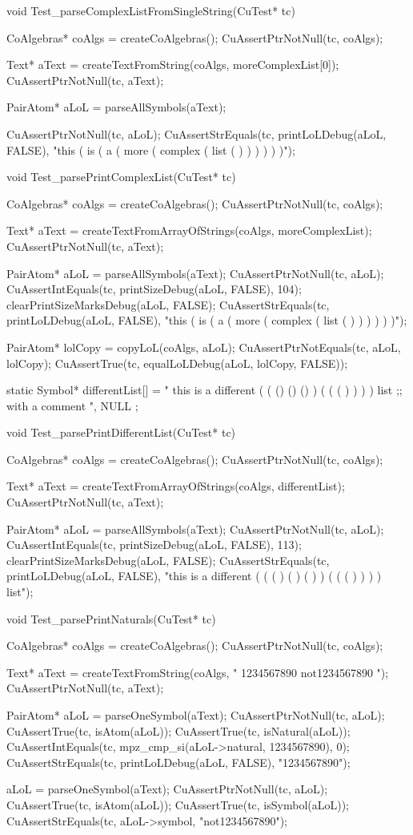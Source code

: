 void Test_parseComplexListFromSingleString(CuTest* tc) {
  CoAlgebras* coAlgs = createCoAlgebras();
  CuAssertPtrNotNull(tc, coAlgs);

  Text* aText = createTextFromString(coAlgs, moreComplexList[0]);
  CuAssertPtrNotNull(tc, aText);

  PairAtom* aLoL = parseAllSymbols(aText);

  CuAssertPtrNotNull(tc, aLoL);
  CuAssertStrEquals(tc, printLoLDebug(aLoL, FALSE),
    "this ( is ( a ( more ( complex ( list ( ) ) ) ) ) )");
}

void Test_parsePrintComplexList(CuTest* tc) {
  CoAlgebras* coAlgs = createCoAlgebras();
  CuAssertPtrNotNull(tc, coAlgs);

  Text* aText = createTextFromArrayOfStrings(coAlgs, moreComplexList);
  CuAssertPtrNotNull(tc, aText);

  PairAtom* aLoL = parseAllSymbols(aText);
  CuAssertPtrNotNull(tc, aLoL);
  CuAssertIntEquals(tc, printSizeDebug(aLoL, FALSE), 104);
  clearPrintSizeMarksDebug(aLoL, FALSE);
  CuAssertStrEquals(tc, printLoLDebug(aLoL, FALSE),
    "this ( is ( a ( more ( complex ( list ( ) ) ) ) ) )");

  PairAtom* lolCopy = copyLoL(coAlgs, aLoL);
  CuAssertPtrNotEquals(tc, aLoL, lolCopy);
  CuAssertTrue(tc, equalLoLDebug(aLoL, lolCopy, FALSE));
}

static Symbol* differentList[] = {
 " this is  a different ( ( () () () ) ( ( ( ) ) ) ) list ;; with a comment  ",
 NULL
};

void Test_parsePrintDifferentList(CuTest* tc) {
  CoAlgebras* coAlgs = createCoAlgebras();
  CuAssertPtrNotNull(tc, coAlgs);

  Text* aText = createTextFromArrayOfStrings(coAlgs, differentList);
  CuAssertPtrNotNull(tc, aText);

  PairAtom* aLoL = parseAllSymbols(aText);
  CuAssertPtrNotNull(tc, aLoL);
  CuAssertIntEquals(tc, printSizeDebug(aLoL, FALSE), 113);
  clearPrintSizeMarksDebug(aLoL, FALSE);
  CuAssertStrEquals(tc, printLoLDebug(aLoL, FALSE),
    "this is a different ( ( ( ) ( ) ( ) ) ( ( ( ) ) ) ) list");
}

void Test_parsePrintNaturals(CuTest* tc) {
  CoAlgebras* coAlgs = createCoAlgebras();
  CuAssertPtrNotNull(tc, coAlgs);

  Text* aText = createTextFromString(coAlgs, " 1234567890 not1234567890 ");
  CuAssertPtrNotNull(tc, aText);

  PairAtom* aLoL = parseOneSymbol(aText);
  CuAssertPtrNotNull(tc, aLoL);
  CuAssertTrue(tc, isAtom(aLoL));
  CuAssertTrue(tc, isNatural(aLoL));
  CuAssertIntEquals(tc,  mpz_cmp_si(aLoL->natural, 1234567890), 0);
  CuAssertStrEquals(tc, printLoLDebug(aLoL, FALSE), "1234567890");

  aLoL = parseOneSymbol(aText);
  CuAssertPtrNotNull(tc, aLoL);
  CuAssertTrue(tc, isAtom(aLoL));
  CuAssertTrue(tc, isSymbol(aLoL));
  CuAssertStrEquals(tc, aLoL->symbol, "not1234567890");
}


